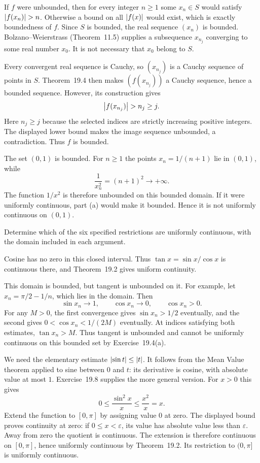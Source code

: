 If $f$ were unbounded, then for every integer $n\ge1$ some
$x_n\in S$ would satisfy $\abs{f(x_n)}>n$. Otherwise a bound
on all $\left|f(x)\right|$ would exist, which is exactly boundedness
of $f$. Since $S$ is bounded, the real sequence $(x_n)$ is
bounded. Bolzano--Weierstrass (Theorem~11.5) supplies a subsequence
$x_{n_j}$ converging to some real number $x_0$.
It is not necessary that $x_0$ belong to $S$.

Every convergent real sequence is Cauchy, so $(x_{n_j})$ is a
Cauchy sequence of points in $S$. Theorem~19.4 then makes
$(f(x_{n_j}))$ a Cauchy sequence, hence a bounded sequence.
However, its construction gives
\[
 \abs{f(x_{n_j})}>n_j\ge j.
\]
Here $n_j\ge j$ because the selected indices are strictly
increasing positive integers. The displayed lower bound makes
the image sequence unbounded, a contradiction. Thus $f$ is bounded.

The set $(0,1)$ is bounded. For $n\ge1$ the points
$x_n=1/(n+1)$ lie in $(0,1)$, while
\[
 \frac1{x_n^2}=(n+1)^2\longrightarrow+\infty.
\]
The function $1/x^2$ is therefore unbounded on this bounded
domain. If it were uniformly continuous, part (a) would make
it bounded. Hence it is not uniformly continuous on $(0,1)$.

\goal Determine which of the six specified restrictions are
uniformly continuous, with the domain included in each argument.

Cosine has no zero in this closed interval. Thus
$\tan x=\sin x/\cos x$ is continuous there, and Theorem~19.2
gives uniform continuity.

\step{(b) The tangent on $[0,\pi/2)$.}
This domain is bounded, but tangent is unbounded on it.
For example, let $x_n=\pi/2-1/n$, which lies in the domain.
Then
\[
 \sin x_n\to1,\qquad \cos x_n\to0,
 \qquad \cos x_n>0.
\]
For any $M>0$, the first convergence gives $\sin x_n>1/2$
eventually, and the second gives $0<\cos x_n<1/(2M)$
eventually. At indices satisfying both estimates,
$\tan x_n>M$. Thus tangent is unbounded and cannot be
uniformly continuous on this bounded set by Exercise~19.4(a).

\step{(c) The function $(\sin^2x)/x$ on $(0,\pi]$.}
We need the elementary estimate $\left|\sin t\right|\le\left|t\right|$.
It follows from the Mean Value theorem applied to sine between
$0$ and $t$: its derivative is cosine, with absolute value at
most $1$. Exercise~19.8 supplies the more general version.
For $x>0$ this gives
\[
 0\le\frac{\sin^2x}{x}\le\frac{x^2}{x}=x.
\]
Extend the function to $[0,\pi]$ by assigning value $0$ at zero.
The displayed bound proves continuity at zero: if
$0\le x<\varepsilon$, its value has absolute value less than
$\varepsilon$. Away from zero the quotient is continuous.
The extension is therefore continuous on $[0,\pi]$, hence
uniformly continuous by Theorem~19.2. Its restriction to
$(0,\pi]$ is uniformly continuous.


